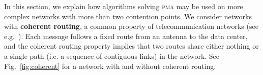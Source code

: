 \documentclass[a4paper,UKenglish,cleveref, autoref, thm-restate]{lipics-v2019}
\newcommand\pma{\textsc{pma}\xspace}
\begin{document}
In this section, we explain how algorithms solving \pma may be used on more complex networks with more than two contention points.
We consider networks with \textbf{coherent routing}, a common property of telecommunication networks (see e.g.~\cite{Schwiebert1996ANA}).
Each message follows a fixed route from an antenna to the data center, and the coherent routing property implies that two routes share either nothing or a single path (i.e. a sequence of contiguous links) in the network. See Fig.~\ref{fig:coherent} for a network with and without coherent routing.

\begin{figure}
\begin{center}
\begin{minipage}[c]{.45\linewidth}
\end{minipage}
\end{center}
\end{figure}
\end{document}
